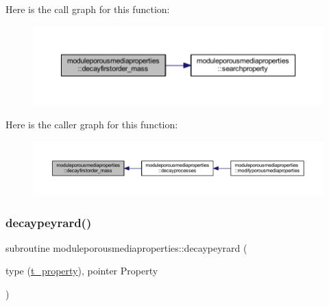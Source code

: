 Here is the call graph for this function\+:\nopagebreak
\begin{figure}[H]
\begin{center}
\leavevmode
\includegraphics[width=350pt]{namespacemoduleporousmediaproperties_accf60e0dd2d0f11fb4815a77bd7db219_cgraph}
\end{center}
\end{figure}
Here is the caller graph for this function\+:\nopagebreak
\begin{figure}[H]
\begin{center}
\leavevmode
\includegraphics[width=350pt]{namespacemoduleporousmediaproperties_accf60e0dd2d0f11fb4815a77bd7db219_icgraph}
\end{center}
\end{figure}
\mbox{\label{namespacemoduleporousmediaproperties_a9e4d029f1da0a9fa9ea00b76a2a21ffd}} 
\subsubsection{\texorpdfstring{decaypeyrard()}{decaypeyrard()}}
{\footnotesize\ttfamily subroutine moduleporousmediaproperties\+::decaypeyrard (\begin{DoxyParamCaption}\item[{type (\mbox{\hyperlink{structmoduleporousmediaproperties_1_1t__property}{t\+\_\+property}}), pointer}]{Property }\end{DoxyParamCaption})\hspace{0.3cm}{\ttfamily [private]}}

